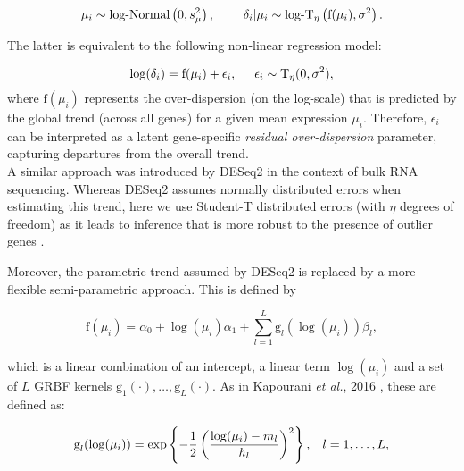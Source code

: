 \begin{equation} \label{eq::jointprior} \mu_i \sim \text{log-Normal}\left(0, s^2_{\mu}\right), \hspace{0.8cm}
\delta_i | \mu_i \sim \text{log-}\text{T}_{\eta}\left( \text{f}(\mu_i), \sigma^2 \right).
\end{equation} 

The latter is equivalent to the following non-linear regression model:

\begin{equation} \label{eq::regression}
\log(\delta_i) =\text{f}(\mu_i)+\epsilon_i, \hspace{0.5cm} \epsilon_i \sim{}\text{T}_{\eta}(0,\sigma^2), 
\end{equation} where $\text{f}(\mu_i)$ represents the over-dispersion (on the log-scale) that is predicted by the global trend (across all genes) for a given mean expression $\mu_i$. Therefore, $\epsilon_i$ can be interpreted as a latent gene-specific \textit{residual over-dispersion} parameter, capturing departures from the overall trend. \\

A similar approach was introduced by DESeq2 \citep{Love2014} in the context of bulk RNA sequencing. Whereas DESeq2 assumes normally distributed errors when estimating this trend, here we use Student-T distributed errors (with $\eta$ degrees of freedom) as it leads to inference that is more robust to the presence of outlier genes \citep{Fernandez1999}. 

\newpage

Moreover, the parametric trend assumed by DESeq2 is replaced by a more flexible semi-parametric approach. This is defined by

\begin{equation} \label{eq::trend}
\text{f}(\mu_i) = \alpha_0 + \log(\mu_i)\alpha_1 + \sum_{l=1}^L \text{g}_l(\log(\mu_i))\beta_l,
\end{equation} 

which is a linear combination of an intercept, a linear term $\log(\mu_i)$ and a set of $L$ \gls{GRBF} kernels $\text{g}_1(\cdot), \ldots, \text{g}_L(\cdot)$. As in Kapourani \emph{et al.}, 2016 \cite{Kapourani2016}, these are defined as: 

\begin{equation} \label{eq::GRBF}
\text{g}_l(\log(\mu_i)) = \exp\left\lbrace-\frac{1}{2}\left(\dfrac{\log(\mu_i)-m_l}{h_l}\right)^2\right\rbrace, \hspace{0.3cm} l = 1, \ldots, L,
\end{equation} 

